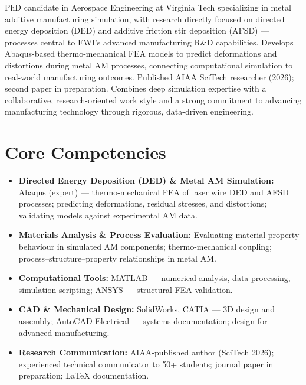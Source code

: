 \documentclass[11pt,a4paper]{moderncv}
\begin{document}
\makecvtitle


\vspace{6pt}
\small{PhD candidate in Aerospace Engineering at Virginia Tech specializing in metal additive manufacturing simulation, with research directly focused on directed energy deposition (DED) and additive friction stir deposition (AFSD) --- processes central to EWI's advanced manufacturing R\&D capabilities. Develops Abaqus-based thermo-mechanical FEA models to predict deformations and distortions during metal AM processes, connecting computational simulation to real-world manufacturing outcomes. Published AIAA SciTech researcher (2026); second paper in preparation. Combines deep simulation expertise with a collaborative, research-oriented work style and a strong commitment to advancing manufacturing technology through rigorous, data-driven engineering.}


\section{Core Competencies}
\vspace{1pt}
\begin{itemize}

\item \textbf{Directed Energy Deposition (DED) \& Metal AM Simulation:} Abaqus (expert) --- thermo-mechanical FEA of laser wire DED and AFSD processes; predicting deformations, residual stresses, and distortions; validating models against experimental AM data.
\vspace{1pt}

\item \textbf{Materials Analysis \& Process Evaluation:} Evaluating material property behaviour in simulated AM components; thermo-mechanical coupling; process--structure--property relationships in metal AM.
\vspace{1pt}

\item \textbf{Computational Tools:} MATLAB --- numerical analysis, data processing, simulation scripting; ANSYS --- structural FEA validation.
\vspace{1pt}

\item \textbf{CAD \& Mechanical Design:} SolidWorks, CATIA --- 3D design and assembly; AutoCAD Electrical --- systems documentation; design for advanced manufacturing.
\vspace{1pt}

\item \textbf{Research Communication:} AIAA-published author (SciTech 2026); experienced technical communicator to 50+ students; journal paper in preparation; LaTeX documentation.

\end{itemize}
\end{document}
